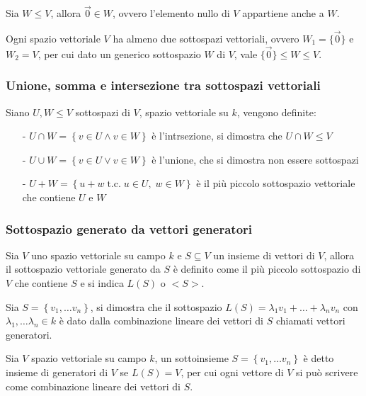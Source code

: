 \documentclass[a4paper]{article}
\newcommand\tc{\;\text{t.c.}\;} %
\begin{document}
Sia \(W \leq V\), allora \(\vec{0} \in W\), ovvero l'elemento nullo di \(V\) appartiene anche a \(W\).

Ogni spazio vettoriale \(V\) ha almeno due sottospazi vettoriali, ovvero \(W_1 = \{ \vec{0} \}\) e \(W_2 = V\), per cui
dato un generico sottospazio \(W\) di \(V\), vale \(\{ \vec{0} \} \leq W \leq V\).

\subsubsection*{Unione, somma e intersezione tra sottospazi vettoriali}
Siano \(U, W \leq V\) sottospazi di \(V\), spazio vettoriale su \(k\), vengono definite:
\begin{itemize}[topsep=3pt, itemsep=0pt]
	\item[-] \(U \cap W = \left\{ v \in U \land v \in W \right\}\) è l'intrsezione, si dimostra che \(U \cap W \leq V\)
	\item[-] \(U \cup W = \left\{ v \in U \lor v \in W \right\}\) è l'unione, che si dimostra non essere sottospazi
	\item[-] \(U + W = \left\{ u + w \tc u \in U, \; w \in W\right\}\) è il più piccolo sottospazio vettoriale che
	contiene \(U\) e \(W\)
\end{itemize}

\subsubsection*{Sottospazio generato da vettori generatori}
Sia \(V\) uno spazio vettoriale su campo \(k\) e \(S \subseteq V\) un insieme di vettori di \(V\), allora il sottospazio vettoriale
generato da \(S\) è definito come il più piccolo sottospazio di \(V\) che contiene \(S\) e si indica \(L(S)\) o \(<S>\).

Sia \(S = \left\{ v_1, \dots v_n \right\}\), si dimostra che il sottospazio \(L(S) = \lambda_1 v_1 + \dots + \lambda_n v_n\) con
\(\lambda_1, \dots \lambda_n \in k\) è dato dalla combinazione lineare dei vettori di \(S\) chiamati vettori generatori.

Sia \(V\) spazio vettoriale su campo \(k\), un sottoinsieme \(S = \left\{ v_1, \dots v_n \right\}\) è detto insieme di generatori
di \(V\) se \(L(S) = V\), per cui ogni vettore di \(V\) si può scrivere come combinazione lineare dei vettori di \(S\).

\newpage
\end{document}
